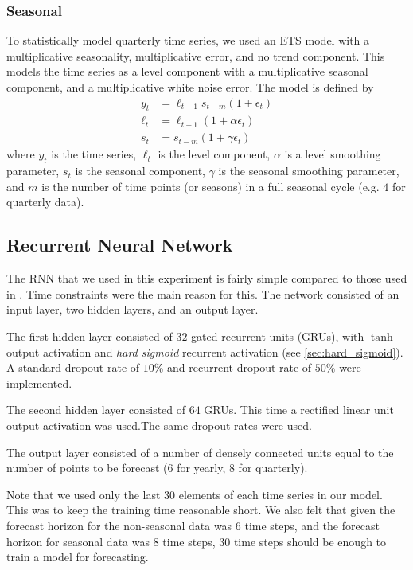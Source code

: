 \documentclass[a4paper,12pt]{article}
\theoremstyle{definition}
\begin{document}
\subsubsection{Seasonal}\label{sec:seasonal_stats_modelling}
To statistically model quarterly time series, we used an ETS model with a multiplicative seasonality, multiplicative error, and no trend component. This models the time series as a level component with a multiplicative seasonal component, and a multiplicative white noise error. The model is defined by
\begin{align}
	y_t &= \ell_{t-1}s_{t-m}(1 + \epsilon_t) \label{eq:seasonal_series} \\
	\ell_t &= \ell_{t-1}(1 + \alpha \epsilon_t) \label{eq:seasonal_level} \\
	s_t &= s_{t-m}(1 + \gamma \epsilon_t) \label{eq:seasonal_season}
\end{align}
where $y_t$ is the time series, $\ell_t$ is the level component, $\alpha$ is a level smoothing parameter, $s_t$ is the seasonal component, $\gamma$ is the seasonal smoothing parameter, and $m$ is the number of time points (or seasons) in a full seasonal cycle (e.g. $4$ for quarterly data).

\subsection{Recurrent Neural Network}
The RNN that we used in this experiment is fairly simple compared to those used in \cite{smyl}. Time constraints were the main reason for this. The network consisted of an input layer, two hidden layers, and an output layer. 

The first hidden layer consisted of $32$ gated recurrent units (GRUs), with $\tanh$ output activation and \textit{hard sigmoid} recurrent activation (see \ref{sec:hard_sigmoid}). A standard dropout rate of $10\%$ and recurrent dropout rate of $50\%$ were implemented.

The second hidden layer consisted of $64$ GRUs. This time a rectified linear unit output activation was used.The same dropout rates were used.

The output layer consisted of a number of densely connected units equal to the number of points to be forecast ($6$ for yearly, $8$ for quarterly).

Note that we used only the last $30$ elements of each time series in our model. This was to keep the training time reasonable short. We also felt that given the forecast horizon for the non-seasonal data was $6$ time steps, and the forecast horizon for seasonal data was $8$ time steps, $30$ time steps should be enough to train a model for forecasting. 
\end{document}
